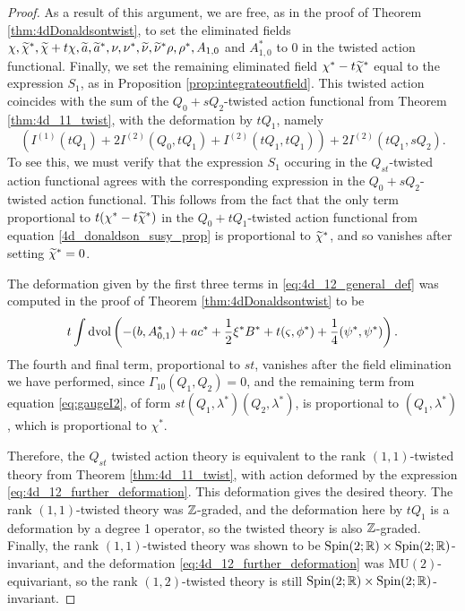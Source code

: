 \documentclass[10pt, oneside]{article}
\newcommand{\MU}{\mathrm{MU}}
\begin{document}
\begin{proof}
As a result of this argument, we are free, as in the proof of Theorem \ref{thm:4dDonaldsontwist}, to set the eliminated fields $\chi, \widetilde{\chi}^*, \widetilde{\chi} + t\chi, \widetilde{a}, \widetilde{a}^*, \nu, \nu^*, \widetilde{\nu}, \widetilde{\nu}^* \rho, \rho^*, A_{1,0}$ and $A_{1,0}^*$ to 0 in the twisted action functional.  Finally, we set the remaining eliminated field $\chi^*-t\widetilde{\chi}^*$ equal to the expression $S_1$, as in Proposition \ref{prop:integrateoutfield}.  This twisted action coincides with the sum of the $Q_0 + sQ_2$-twisted action functional from Theorem \ref{thm:4d_11_twist}, with the deformation by $tQ_1$, namely
\begin{equation}
\label{eq:4d_12_general_def}
\left(I^{(1)}(tQ_1) + 2 I^{(2)}(Q_0, tQ_1) + I^{(2)}(tQ_1, tQ_1)\right) + 2I^{(2)}(tQ_1, sQ_2).
\end{equation}
To see this, we must verify that the expression $S_1$ occuring in the $Q_{st}$-twisted action functional agrees with the corresponding expression in the $Q_0 + sQ_2$-twisted action functional.  This follows from the fact that the only term proportional to $t(\chi^*-t\widetilde{\chi}^*)$ in the $Q_0 + tQ_1$-twisted action functional from equation \ref{4d_donaldson_susy_prop} is proportional to $\widetilde{\chi}^*$, and so vanishes after setting $\widetilde{\chi}^* = 0$.

The deformation given by the first three terms in \ref{eq:4d_12_general_def} was computed in the proof of Theorem \ref{thm:4dDonaldsontwist} to be
\begin{equation}
\label{eq:4d_12_further_deformation}
t \int\operatorname{dvol}\left(-(b, A_{0, 1}^*) + a c^* + \frac{1}{2} \xi^* B^* + t (\varsigma, \phi^*) + \frac 14 (\psi^*, \psi^*) \right).
\end{equation}
The fourth and final term, proportional to $st$, vanishes after the field elimination we have performed, since $\Gamma_{10}(Q_1,Q_2) = 0$, and the remaining term from equation \ref{eq:gaugeI2}, of form $st(Q_1,\lambda^*)(Q_2,\lambda^*)$, is proportional to $(Q_1,\lambda^*)$, which is proportional to $\chi^*$.

Therefore, the $Q_{st}$ twisted action theory is equivalent to the rank $(1,1)$-twisted theory from Theorem \ref{thm:4d_11_twist}, with action deformed by the expression \ref{eq:4d_12_further_deformation}.  This deformation gives the desired theory.  The rank $(1,1)$-twisted theory was $\mathbb Z$-graded, and the deformation here by $tQ_1$ is a deformation by a degree 1 operator, so the twisted theory is also $\mathbb Z$-graded.  Finally, the rank $(1,1)$-twisted theory was shown to be $\mathrm{Spin}(2;\mathbb R) \times \mathrm{Spin}(2;\mathbb R)$-invariant, and the deformation \ref{eq:4d_12_further_deformation} was $\MU(2)$-equivariant, so the rank $(1,2)$-twisted theory is still $\mathrm{Spin}(2;\mathbb R) \times \mathrm{Spin}(2;\mathbb R)$-invariant.

\end{proof}
\end{document}
